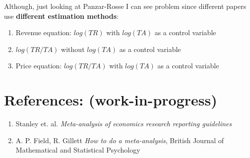 \documentclass{article}
\begin{document}
\newline \noindent
Although, just looking at Panzar-Rosse I can see problem since different papers use \textbf{different estimation methods}:
\begin{enumerate}
    \item Revenue equation: $log(TR)$ with $log(TA)$ as a control variable
    \item $log(TR/TA)$  without $log(TA)$ as a control variable
    \item Price equation: $log(TR/TA)$ with $log(TA)$ as a control variable
\end{enumerate}

\newpage

\section*{References: (work-in-progress)}

\begin{enumerate}
    \item Stanley et. al. \textit{Meta-analysis of economics research reporting guidelines}
    \item A. P. Field, R. Gillett \textit{How to do a meta-analysis}, British Journal of Mathematical and Statistical Psychology
\end{enumerate}
\end{document}
